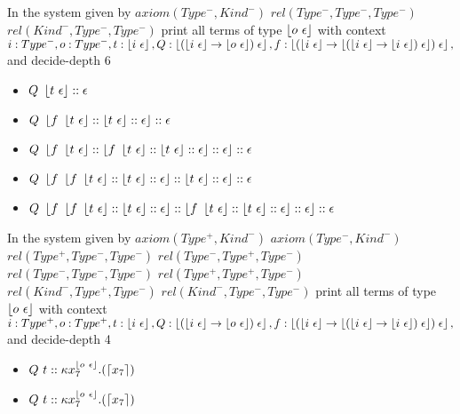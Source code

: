 \documentclass{scrartcl}
\begin{document}
In the system given by $axiom (Type^-,Kind^-)$ $rel (Type^-,Type^-,Type^-)$ $rel (Kind^-,Type^-,Type^-)$ print all terms of type $\left \lfloor o~\epsilon \right \rfloor$ with context ${i:Type^-,o:Type^-,t:\left \lfloor i~\epsilon \right \rfloor,Q:\left \lfloor (\left \lfloor i~\epsilon \right \rfloor \to \left \lfloor o~\epsilon \right \rfloor) \; \epsilon \right \rfloor,f:\left \lfloor (\left \lfloor i~\epsilon \right \rfloor \to \left \lfloor (\left \lfloor i~\epsilon \right \rfloor \to \left \lfloor i~\epsilon \right \rfloor) \; \epsilon \right \rfloor) \; \epsilon \right \rfloor,}$ and decide-depth 6
\begin{itemize}
\item $ Q~\left \lfloor t~\epsilon \right \rfloor :: \epsilon $
\item $ 
 Q~\left \lfloor f~\left \lfloor t~\epsilon \right \rfloor :: \left \lfloor t~\epsilon \right \rfloor :: \epsilon \right \rfloor :: \epsilon 
 $
\item $ 
 Q~\left \lfloor f~\left \lfloor t~\epsilon \right \rfloor :: \left \lfloor f~\left \lfloor t~\epsilon \right \rfloor :: \left \lfloor t~\epsilon \right \rfloor :: \epsilon \right \rfloor :: \epsilon \right \rfloor :: \epsilon 
 $
\item $ 
 Q~\left \lfloor f~\left \lfloor f~\left \lfloor t~\epsilon \right \rfloor :: \left \lfloor t~\epsilon \right \rfloor :: \epsilon \right \rfloor :: \left \lfloor t~\epsilon \right \rfloor :: \epsilon \right \rfloor :: \epsilon 
 $
\item $ 
 Q~\left \lfloor f~\left \lfloor f~\left \lfloor t~\epsilon \right \rfloor :: \left \lfloor t~\epsilon \right \rfloor :: \epsilon \right \rfloor :: \left \lfloor f~\left \lfloor t~\epsilon \right \rfloor :: \left \lfloor t~\epsilon \right \rfloor :: \epsilon \right \rfloor :: \epsilon \right \rfloor :: \epsilon 
 $
\end{itemize}
In the system given by $axiom (Type^+,Kind^-)$ $axiom (Type^-,Kind^-)$ $rel (Type^+,Type^-,Type^-)$ $rel (Type^-,Type^+,Type^-)$ $rel (Type^-,Type^-,Type^-)$ $rel (Type^+,Type^+,Type^-)$ $rel (Kind^-,Type^+,Type^-)$ $rel (Kind^-,Type^-,Type^-)$ print all terms of type $\left \lfloor o~\epsilon \right \rfloor$ with context ${i:Type^+,o:Type^+,t:\left \lfloor i~\epsilon \right \rfloor,Q:\left \lfloor (\left \lfloor i~\epsilon \right \rfloor \to \left \lfloor o~\epsilon \right \rfloor) \; \epsilon \right \rfloor,f:\left \lfloor (\left \lfloor i~\epsilon \right \rfloor \to \left \lfloor (\left \lfloor i~\epsilon \right \rfloor \to \left \lfloor i~\epsilon \right \rfloor) \; \epsilon \right \rfloor) \; \epsilon \right \rfloor,}$ and decide-depth 4
\begin{itemize}
\item $ 
 Q~t :: \kappa x_7^{\left \lfloor o~\epsilon \right \rfloor}.(\left \lceil x_7 \right \rceil) 
 $
\item $ 
 Q~t :: \kappa x_7^{\left \lfloor o~\epsilon \right \rfloor}.(\left \lceil x_7 \right \rceil) 
 $
\end{itemize}
\end{document}
